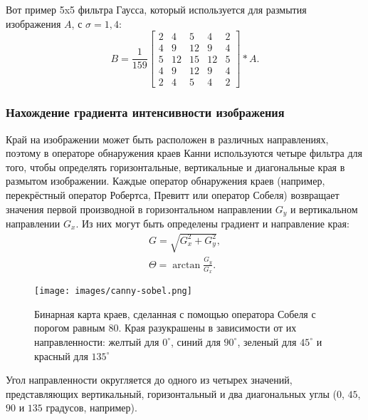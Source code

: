 Вот пример 5x5 фильтра Гаусса, который используется для размытия изображения $A$, с $\sigma = 1,4$:
\begin{displaymath}
  B = \frac{1}{159}
  \begin{bmatrix}
    2 &  4 &  5 &  4 & 2 \\
    4 &  9 & 12 &  9 & 4 \\
    5 & 12 & 15 & 12 & 5 \\
    4 &  9 & 12 &  9 & 4 \\
    2 &  4 &  5 &  4 & 2
  \end{bmatrix} * A.
\end{displaymath}

\subsubsection{Нахождение градиента интенсивности изображения}
Край на изображении может быть расположен в различных направлениях, поэтому в операторе обнаружения краев Канни используются четыре фильтра для того, чтобы определять горизонтальные, вертикальные и диагональные края в размытом изображении. Каждые оператор обнаружения краев (например, перекрёстный оператор Робертса, Превитт или оператор Собеля) возвращает значения первой производной в горизонтальном направлении $G_y$ и вертикальном направлении $G_x$. Из них могут быть определены градиент и направление края:
\begin{gather*}
  G = \sqrt{G_x^2 + G_y^2},\\
  \Theta = \arctan{\frac{G_y}{G_x}}.
\end{gather*}

\begin{figure}
  \centering
  \texttt{[image: images/canny-sobel.png]}
  \caption{Бинарная карта краев, сделанная с помощью оператора Собеля с порогом равным $80$. Края разукрашены в зависимости от их направленности: желтый для $0^{\circ}$, синий для $90^{\circ}$, зеленый для $45^{\circ}$ и красный для $135^{\circ}$\label{canny-sobel}}
\end{figure}

Угол направленности округляется до одного из четырех значений, представляющих вертикальный, горизонтальный и два диагональных углы ($0$, $45$, $90$ и $135$ градусов, например).


